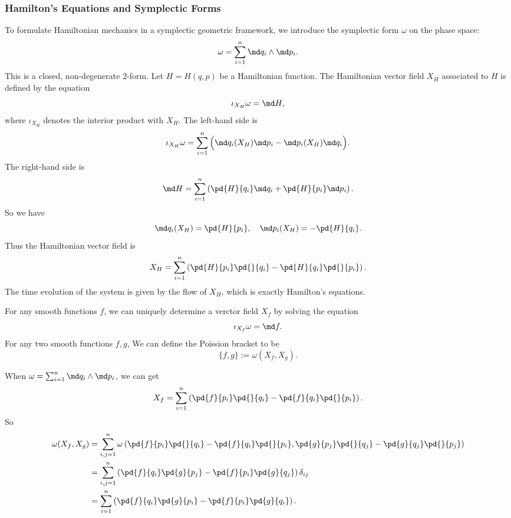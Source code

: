 \subsubsection*{Hamilton's Equations and Symplectic Forms}
To formulate Hamiltonian mechanics in a symplectic geometric framework,
we introduce the symplectic form $\omega$ on the phase space:
\begin{equation*}
    \omega = \sum_{i=1}^n \md q_i \wedge \md p_i.
\end{equation*}
This is a closed, non-degenerate 2-form. Let $H = H(q,p)$ be a 
Hamiltonian function. The Hamiltonian vector field $X_H$ associated 
to $H$ is defined by the equation
\begin{equation*}
    \iota_{X_H}\omega = \md H, 
\end{equation*}
where $\iota_{X_H}$ denotes the interior product with $X_H$. 
The left-hand side is 
\begin{equation*}
    \iota_{X_H}\omega = \sum_{i=1}^n\Big(\md q_i(X_H)\md p_i 
    - \md p_i(X_H)\md q_i\Big).
\end{equation*}
The right-hand side is
\begin{equation*}
    \md H = \sum_{i=1}^n\left(\pd{H}{q_i}\md q_i + \pd{H}{p_i}\md p_i\right).
\end{equation*}
So we have
\begin{equation*}
    \md q_i(X_H) = \pd{H}{p_i}, \quad \md p_i(X_H) = -\pd{H}{q_i}.
\end{equation*}
Thus the Hamiltonian vector field is 
\begin{equation*}
    X_H = \sum_{i=1}^n\left(\pd{H}{p_i}\pd{}{q_i} 
    - \pd{H}{q_i}\pd{}{p_i}\right).
\end{equation*}
The time evolution of the system is given by the flow of $X_H$, which 
is exactly Hamilton's equations. 

For any smooth functions $f$, we can uniquely determine a verctor field 
$X_f$ by solving the equation 
\begin{equation*}
    \iota_{X_f}\omega = \md f.
\end{equation*}
For any two smooth functions $f,g$, We can define the Poission bracket to be 
\begin{equation*}
    \{f,g\} := \omega(X_f,X_g).
\end{equation*}

When $\omega = \sum_{i=1}^{n}\md q_i\wedge \md p_i$, we can get
\begin{equation*}
    X_f = \sum_{i=1}^{n}\left(\pd{f}{p_i}\pd{}{q_i} 
    - \pd{f}{q_i}\pd{}{p_i}\right).
\end{equation*}
So 
\begin{align*}
    \omega(X_f,X_g) &= \sum_{i,j=1}^{n}
    \omega\left(\pd{f}{p_i}\pd{}{q_i}-\pd{f}{q_i}\pd{}{p_i},
    \pd{g}{p_j}\pd{}{q_j}-\pd{g}{q_j}\pd{}{p_j}\right) \\
    &= \sum_{i,j=1}^{n}\left(\pd{f}{q_i}\pd{g}{p_j} 
    - \pd{f}{p_i}\pd{g}{q_j}\right)\delta_{ij} \\
    &= \sum_{i=1}^{n}
    \left(\pd{f}{q_i}\pd{g}{p_i} - \pd{f}{p_i}\pd{g}{q_i}\right).
\end{align*}

